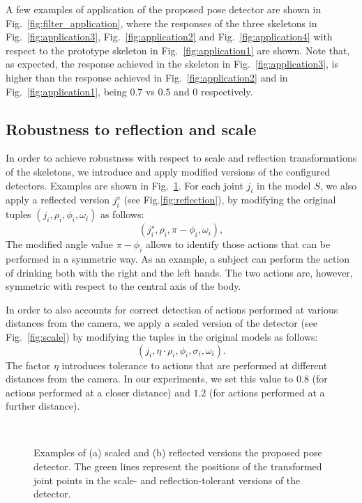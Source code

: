 \documentclass[runningheads,a4paper]{llncs}
\begin{document}
A few examples of application of the proposed pose detector are shown in Fig.~\ref{fig:filter_application}, where the responses of the three skeletons in Fig.~\ref{fig:application3}, Fig.~\ref{fig:application2} and Fig.~\ref{fig:application4} with respect to the prototype skeleton in Fig.~\ref{fig:application1} are shown. Note that, as expected, the response achieved in the skeleton in Fig.~\ref{fig:application3}, is higher than the response achieved in Fig.~\ref{fig:application2} and in Fig.~\ref{fig:application1}, being $0.7$ vs $0.5$ and $0$ respectively.


\subsection{Robustness to reflection and scale}
In order to achieve robustness with respect to scale and reflection transformations of the skeletons, we introduce and apply modified versions of the configured detectors. Examples are shown in Fig.~\ref{fig:scale_reflection}. 
For each joint $j_i$ in the model $S$, we also apply a reflected version $j_i^s$ (see Fig.\ref{fig:reflection}), by modifying the original tuples $(j_i, \rho_i, \phi_i, \omega_{i})$ as follows: 
\begin{equation}
(j_i^s, \rho_i, \pi - \phi_i, \omega_i),
\end{equation}
The modified angle value $\pi - \phi_i$ allows to identify those actions that can be performed in a symmetric way. As an example, a subject can perform the action of drinking both with the right and the left hands. The two actions are, however, symmetric with respect to the central axis of the body.

In order to also accounts for correct detection of actions performed at various distances from the camera, we apply a scaled version of the detector (see Fig.~\ref{fig:scale}) by modifying the tuples in the original models as follows:
\begin{equation}
(j_i, \eta \cdot \rho_i, \phi_i, \sigma_i, \omega_i).
\end{equation}
The factor $\eta$ introduces tolerance to actions that are performed at different distances from the camera. In our experiments, we set this value to $0.8$ (for actions performed at a closer distance) and $1.2$ (for actions performed at a further distance).

\begin{figure}[!t]
   \centering
       \setlength{\unitlength}{42mm}%
    ~
   \caption{Examples of (a) scaled and (b) reflected versions the proposed pose detector. The green lines represent the positions of the transformed joint points in the scale- and reflection-tolerant versions of the detector.}
   \label{fig:scale_reflection}
\end{figure}
\end{document}
